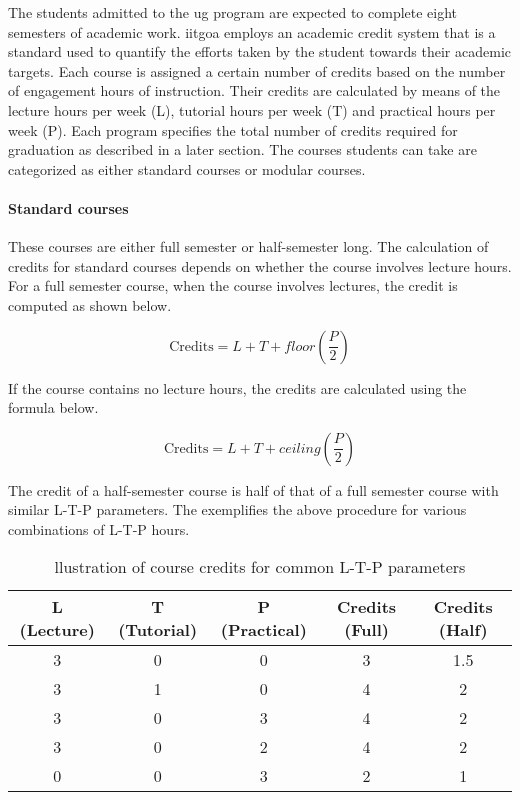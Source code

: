 The \glspl{student} admitted to the \acrshort{ug} program are expected to complete eight semesters of academic work. \acrshort{iitgoa} employs an academic credit system that is a standard used to quantify the efforts taken by the \gls{student} towards their academic targets. Each course is assigned a certain number of credits based on the number of engagement hours of instruction. Their credits are calculated by means of the lecture hours per week (L), tutorial hours per week (T) and practical hours per week (P). Each \gls{program} specifies the total number of credits required for graduation as described in a later section. The courses \glspl{student} can take are categorized as either standard courses or modular courses.

\paragraph{Standard courses} These courses are either full semester or half-semester long. The calculation of credits for standard courses depends on whether the course involves lecture hours. For a full semester course, when the course involves lectures, the credit is computed as shown below.

\begin{equation}
    \mathrm{Credits}=L+T+\mathit{floor}\left(\frac{P}{2}\right)
    \label{lab:CreditFloor}
\end{equation}

If the course contains no lecture hours, the credits are calculated using the formula below.

\begin{equation}
    \mathrm{Credits}=L+T+\mathit{ceiling}\left(\frac{P}{2}\right)
    \label{lab:CreditCeiling}
\end{equation}


The credit of a half-semester course is half of that of a full semester course with similar L-T-P parameters. The  exemplifies the above procedure for various combinations of L-T-P hours.

\begin{table}[t]
	
    \centering

    \begin{tabular}{c c c c c}
    	    \toprule
    \textbf{L (Lecture)} & \textbf{T (Tutorial)} & \textbf{P (Practical)} & \textbf{Credits (Full)} & \textbf{Credits (Half)}\\
    
\midrule
    
     3 & 0 & 0 & 3 & 1.5   \\
     3 & 1 & 0 & 4 & 2 \\
     3 & 0 & 3 & 4 & 2 \\
     3 & 0 & 2 & 4 & 2   \\
     0 & 0 & 3 & 2 & 1  \\
    \bottomrule
    \end{tabular}
    \caption{llustration of course credits for common L-T-P parameters}
    \label{tab:credits-example}
\end{table}


